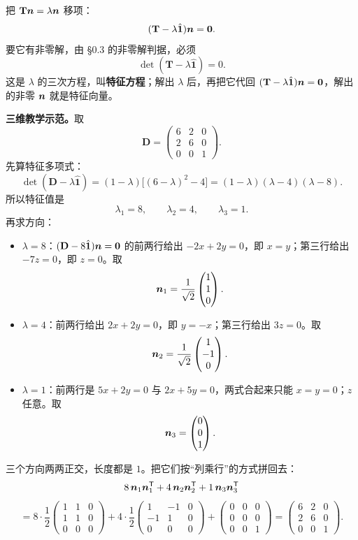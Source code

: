 \documentclass[11pt]{ctexart}
\newcommand{\ten}[1]{\mathbf{#1}}
\newcommand{\unitd}{\hat{\ten{1}}}
\let\origsubhdr\subhdr
\renewcommand{\subhdr}[1]{\par\needspace{3\baselineskip}\origsubhdr{#1}}
\begin{document}

把 $\ten T\vect n=\lambda\vect n$ 移项：
\[
(\ten T-\lambda\unitd)\vect n=\vect 0 .
\]
要它有非零解，由 §0.3 的非零解判据，必须
\[
\det(\ten T-\lambda\unitd)=0 .
\]
这是 $\lambda$ 的三次方程，叫\textbf{特征方程}；解出 $\lambda$ 后，再把它代回 $(\ten T-\lambda\unitd)\vect n=\vect 0$，解出的非零 $\boldsymbol{n}$ 就是特征向量。

\textbf{三维教学示范。}取
\[
\ten D=\begin{pmatrix}6&2&0\\2&6&0\\0&0&1\end{pmatrix}.
\]
先算特征多项式：
\[
\det(\ten D-\lambda\unitd)
=(1-\lambda)\bigl[(6-\lambda)^2-4\bigr]
=(1-\lambda)(\lambda-4)(\lambda-8).
\]
所以特征值是
\[
\lambda_1=8,\qquad \lambda_2=4,\qquad \lambda_3=1.
\]
再求方向：
\begin{itemize}[leftmargin=1.8em,itemsep=2pt]
\item $\lambda=8$：$(\ten D-8\unitd)\vect n=\vect0$ 的前两行给出 $-2x+2y=0$，即 $x=y$；第三行给出 $-7z=0$，即 $z=0$。取
\[
\boldsymbol{n}_1=\frac{1}{\sqrt2}\begin{pmatrix}1\\1\\0\end{pmatrix}.
\]
\item $\lambda=4$：前两行给出 $2x+2y=0$，即 $y=-x$；第三行给出 $3z=0$。取
\[
\boldsymbol{n}_2=\frac{1}{\sqrt2}\begin{pmatrix}1\\-1\\0\end{pmatrix}.
\]
\item $\lambda=1$：前两行是 $5x+2y=0$ 与 $2x+5y=0$，两式合起来只能 $x=y=0$；$z$ 任意。取
\[
\boldsymbol{n}_3=\begin{pmatrix}0\\0\\1\end{pmatrix}.
\]
\end{itemize}
三个方向两两正交，长度都是 $1$。把它们按“列乘行”的方式拼回去：
\[
8\,\boldsymbol{n}_1\boldsymbol{n}_1^{\mathsf T}
+4\,\boldsymbol{n}_2\boldsymbol{n}_2^{\mathsf T}
+1\,\boldsymbol{n}_3\boldsymbol{n}_3^{\mathsf T}
\]
\[
=8\cdot\frac12\begin{pmatrix}1&1&0\\1&1&0\\0&0&0\end{pmatrix}
+4\cdot\frac12\begin{pmatrix}1&-1&0\\-1&1&0\\0&0&0\end{pmatrix}
+\begin{pmatrix}0&0&0\\0&0&0\\0&0&1\end{pmatrix}
=\begin{pmatrix}6&2&0\\2&6&0\\0&0&1\end{pmatrix}.
\]
\end{document}
